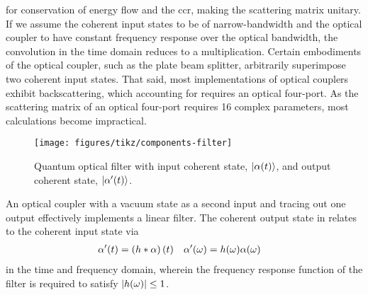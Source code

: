 for conservation of energy flow and the \gls{ccr}, making the scattering matrix unitary.
If we assume the coherent input states to be of narrow-bandwidth and the optical coupler to have constant frequency response over the optical bandwidth, the convolution in the time domain reduces to a multiplication.
Certain embodiments of the optical coupler, such as the plate beam splitter, arbitrarily superimpose two coherent input states.
That said, most implementations of optical couplers exhibit backscattering, which accounting for requires an optical four-port.
As the scattering matrix of an optical four-port requires \num{16} complex parameters, most calculations become impractical.
\begin{figure}[htb]
    \centering
    \texttt{[image: figures/tikz/components-filter]}
    \caption{Quantum optical filter with input coherent state, $\lvert\alpha(t)\rangle$, and output coherent state, $\lvert\alpha^\prime(t)\rangle$.}\label{fig:components_filter}
\end{figure}
An optical coupler with a vacuum state as a second input and tracing out one output effectively implements a linear filter.
The coherent output state in  relates to the coherent input state via
\begin{align*}
	\alpha^\prime(t)
	&=
	\left(h\ast\alpha\right)(t)
	&
	\alpha^\prime(\omega)
	&=
	h(\omega)
	\alpha(\omega)
\end{align*}
in the time and frequency domain, wherein the frequency response function of the filter is required to satisfy $\lvert h(\omega)\rvert\leq1$.

